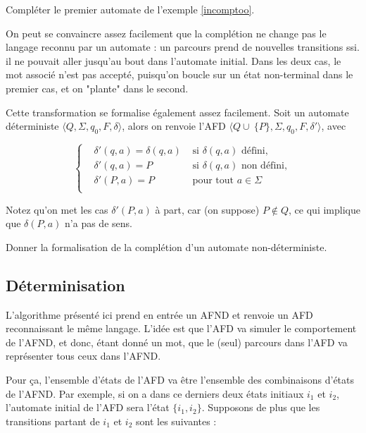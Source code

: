 \begin{exercice}
Compléter le premier automate de l'exemple \ref{incomptoo}.
\end{exercice}

On peut se convaincre assez facilement que la complétion ne change pas le langage reconnu par un automate : un parcours prend de nouvelles transitions ssi. il ne pouvait aller jusqu'au bout dans l'automate initial. Dans les deux cas, le mot associé n'est pas accepté, puisqu'on boucle sur un état non-terminal dans le premier cas, et on "plante" dans le second.

Cette transformation se formalise également assez facilement. Soit un automate déterministe $\big \langle Q,\Sigma,q_0,F,\delta \big \rangle$, alors on renvoie l'AFD $\big \langle Q \cup~\{P\},\Sigma,q_0,F,\delta' \big \rangle$, avec

\[
\left\{\!\begin{aligned}
&\delta'(q,a) = \delta(q,a) &\text{ si } \delta(q,a) \text{ défini},\\[1ex]
&\delta'(q,a) = P &\text{ si } \delta(q,a) \text{ non défini},\\[1ex]
&\delta'(P,a) = P &\text{ pour tout } a \in \Sigma\\[1ex]
\end{aligned}
\]

Notez qu'on met les cas $\delta'(P,a)$ à part, car (on suppose) $P \not\in Q$, ce qui implique que $\delta(P,a)$ n'a pas de sens.

\begin{exercice}
Donner la formalisation de la complétion d'un automate non-déterministe.
\end{exercice}

\subsection{Déterminisation}
\label{det}

L'algorithme présenté ici prend en entrée un AFND et renvoie un AFD reconnaissant le même langage. L'idée est que l'AFD va simuler le comportement de l'AFND, et donc, étant donné un mot, que le (seul) parcours dans l'AFD va représenter tous ceux dans l'AFND.

Pour ça, l'ensemble d'états de l'AFD va être l'ensemble des combinaisons d'états de l'AFND. Par exemple, si on a dans ce derniers deux états initiaux $i_1$ et $i_2$, l'automate initial de l'AFD sera l'état $\{i_1, i_2\}$. Supposons de plus que les transitions partant de $i_1$ et $i_2$ sont les suivantes :

